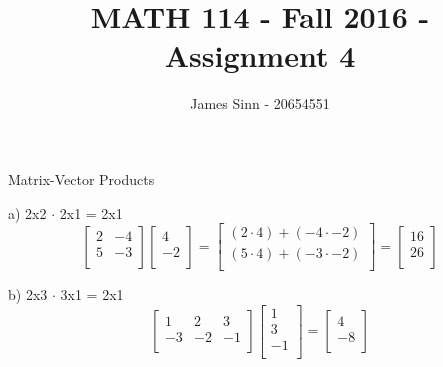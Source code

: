 \documentclass[12pt]{article}
\newcommand{\sqbrl}{\left[}
\newcommand{\sqbrr}{\right]}
\newenvironment{problem}[2][Problem]{\begin{trivlist}
\item[\hskip \labelsep {\bfseries #1}\hskip \labelsep {\bfseries #2.}]}{\end{trivlist}}
\begin{document}
 
 
\title{MATH 114 - Fall 2016 - Assignment 4}
\author{James Sinn - 20654551}
\maketitle
 
 \begin{problem}{1}
 	Matrix-Vector Products
 \end{problem}
 
a) 2x2 $\cdot$ 2x1 = 2x1\\ 
	 \[\sqbrl\begin{matrix}2 & -4\\5 & -3\\ \end{matrix}\sqbrr \sqbrl\begin{matrix}4\\-2\\\end{matrix}\sqbrr
	 = \sqbrl\begin{matrix}(2\cdot4) + (-4\cdot-2)\\(5\cdot4)+(-3\cdot-2)\\\end{matrix}\sqbrr 
	 = \sqbrl\begin{matrix}16\\26\\\end{matrix}\sqbrr\]
	  
b) 2x3 $\cdot$ 3x1 = 2x1\\
	\[\sqbrl\begin{matrix}1 & 2 & 3\\-3 &-2 & -1\\\end{matrix}\sqbrr\sqbrl\begin{matrix}1\\3\\-1\\\end{matrix}\sqbrr
	= \sqbrl\begin{matrix}4\\-8\\\end{matrix}\sqbrr\]
\end{document}

